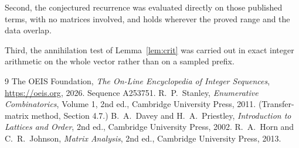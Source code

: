 \documentclass[11pt,a4paper]{article}
\theoremstyle{plain}
\theoremstyle{definition}
\begin{document}
Second, the conjectured recurrence was evaluated directly on those published terms, with no
matrices involved, and holds wherever the proved range and the data overlap.

Third, the annihilation test of Lemma~\ref{lem:crit} was carried out in exact integer
arithmetic on the whole vector rather than on a sampled prefix.

\begin{thebibliography}{9}
 The OEIS Foundation, \emph{The On-Line Encyclopedia of Integer
Sequences}, \url{https://oeis.org}, 2026. Sequence A253751.
 R.~P.~Stanley, \emph{Enumerative Combinatorics}, Volume 1, 2nd ed.,
Cambridge University Press, 2011. (Transfer-matrix method, Section 4.7.)
 B.~A.~Davey and H.~A.~Priestley, \emph{Introduction to Lattices and
Order}, 2nd ed., Cambridge University Press, 2002.
 R.~A.~Horn and C.~R.~Johnson, \emph{Matrix Analysis}, 2nd ed., Cambridge
University Press, 2013.
\end{thebibliography}
\end{document}
